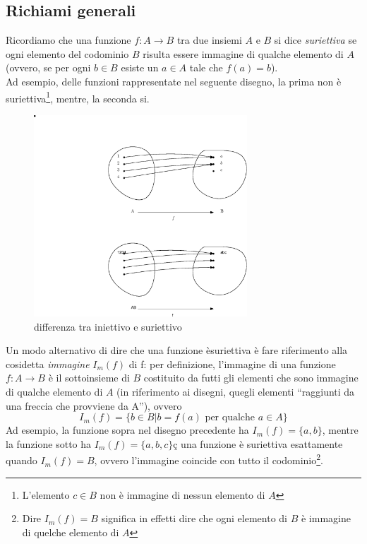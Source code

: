 \subsection{Richiami generali}
\label{sec:inie_surie_app_lin_ric_gen}
Ricordiamo che una funzione $f:A\to B$ tra due insiemi $A$ e $B$ si dice \textit{suriettiva} se
ogni elemento del codominio $B$ risulta essere immagine di qualche elemento di $A$ (ovvero, se
per ogni $b\in B$ esiste un $a\in A$ tale che $f(a)=b$).\\
Ad esempio, delle funzioni rappresentate nel seguente disegno, la prima non è
suriettiva\footnote{L'elemento $c\in B$ non è immagine di nessun elemento di $A$},
mentre, la seconda si.
\begin{figure}[th]
  \centering
  \includegraphics[width=8cm]{img/finiti/imgex4-4-1.eps}
  \caption{differenza tra iniettivo e suriettivo}
\end{figure}
Un modo alternativo di dire che una funzione èsuriettiva è fare riferimento alla cosidetta 
\textit{immagine} $I_m(f)$ di f: per definizione, l'immagine di una funzione $f:A\to B$ è il
sottoinsieme di $B$ costituito da futti gli elementi che sono immagine di qualche elemento di $A$
(in riferimento ai disegni, quegli elementi ``raggiunti da una freccia che provviene da A''),
ovvero
\begin{equation*}
  I_m(f)=\{b\in B | b=f(a) \text{ per qualche } a \in A\}
\end{equation*}
Ad esempio, la funzione sopra nel disegno precedente ha $I_m(f)=\{a,b\}$, mentre la funzione
sotto ha $I_m(f)=\{a,b,c\}$ç una funzione è suriettiva esattamente quando $I_m(f)=B$, ovvero
l'immagine coincide con tutto il codominio\footnote{Dire $I_m(f)=B$ significa in effetti dire
  che ogni elemento di $B$ è immagine di quelche elemento di $A$}.
